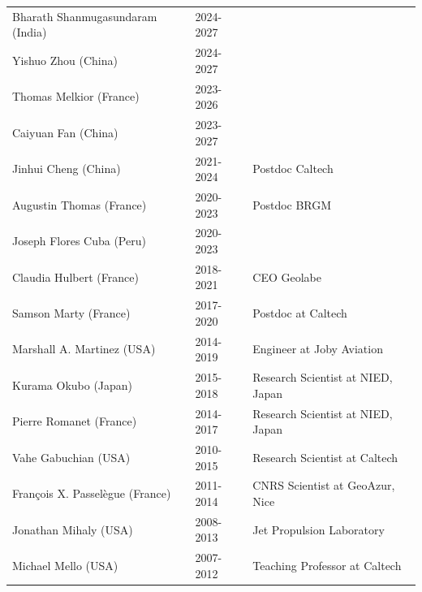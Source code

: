 \documentclass[10pt]{article}
\begin{document}
\begin{table}[h!]
\begin{tabular}{L{6cm}L{2cm}D{7cm}}
\color{groy}Bharath Shanmugasundaram (India)    & 2024-2027&   \\
\color{groy}Yishuo Zhou (China)           		& 2024-2027&   \\
\color{groy}Thomas Melkior (France)       		& 2023-2026&   \\
\color{groy}Caiyuan Fan (China)          		& 2023-2027&   \\
\color{gray}Jinhui Cheng (China)         		& 2021-2024&   Postdoc Caltech\\
\color{gray}Augustin Thomas (France)      		& 2020-2023&   Postdoc BRGM \\
\color{gray}Joseph Flores Cuba (Peru)   		& 2020-2023&   \\
\color{gray}Claudia Hulbert (France)   	  		& 2018-2021&  CEO Geolabe\\
\color{gray}Samson Marty (France)    	      	& 2017-2020&  Postdoc at Caltech\\
\color{gray}Marshall A. Martinez (USA)  		& 2014-2019&  Engineer at Joby Aviation \\
\color{gray}Kurama Okubo (Japan)   	      		& 2015-2018&  Research Scientist at NIED, Japan\\
\color{gray}Pierre Romanet (France)        		& 2014-2017&  Research Scientist at NIED, Japan\\
\color{gray}Vahe Gabuchian (USA)       			& 2010-2015&  Research Scientist at Caltech\\
\color{gray}François X. Passelègue (France)		& 2011-2014&  CNRS Scientist at GeoAzur, Nice\\
\color{gray}Jonathan Mihaly (USA)        		& 2008-2013&  Jet Propulsion Laboratory\\
\color{gray}Michael Mello (USA)          		& 2007-2012&  Teaching Professor at Caltech\\[16pt]
\end{tabular}



\end{table}
\end{document}
